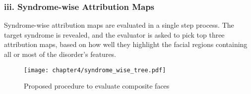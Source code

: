 \documentclass[../report.tex]{subfiles}
\begin{document}
	\subsubsection{iii. Syndrome-wise Attribution Maps}
	Syndrome-wise attribution maps are evaluated in a single step process. The target syndrome is revealed, and the evaluator is asked to pick top three attribution maps, based on how well they highlight the facial regions containing all or most of the disorder's features.
	
	
	\begin{figure}[H]
		\hspace*{4.5cm}      
		\texttt{[image: chapter4/syndrome\_wise\_tree.pdf]}
		\caption{Proposed procedure to evaluate composite faces}
		\label{fig_composite_flow}	
	\end{figure}
\end{document}
